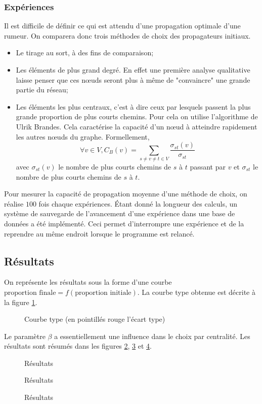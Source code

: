 \documentclass{article}
\newcommand{\resultat}[2]{
  \begin{figure}[!htb]
  \centering
  
  \caption{#2}
  \label{#1}
  \end{figure}
}
\begin{document}
\subsubsection{Expériences}
Il est difficile de définir ce qui est attendu d'une propagation optimale d'une rumeur. On comparera donc trois méthodes de choix des propagateurs initiaux.
\begin{itemize}
  \item Le tirage au sort, à des fins de comparaison;
  \item Les éléments de plus grand degré. En effet une première analyse qualitative laisse penser que ces nœuds seront plus à même de "convaincre" une grande partie du réseau;
  \item Les éléments les plus centraux, c'est à dire ceux par lesquels passent la plus grande proportion de plus courts chemins. Pour cela on utilise l'algorithme de Ulrik Brandes. Cela caractérise la capacité d'un nœud à atteindre rapidement les autres nœuds du graphe. Formellement, $$\forall v\in V, C_B(v) = \sum_{s\neq v\neq t\in V} \frac{\sigma_{st}(v)}{\sigma_{st}}$$ avec $\sigma_{st}(v)$ le nombre de plus courts chemins de $s$ à $t$ passant par $v$ et $\sigma_{st}$ le nombre de plus courts chemins de $s$ à $t$.
\end{itemize}

Pour mesurer la capacité de propagation moyenne d'une méthode de choix, on réalise $100$ fois chaque expériences. Étant donné la longueur des calculs, un système de sauvegarde de l'avancement d'une expérience dans une base de données a été implémenté. Ceci permet d'interrompre une expérience et de la reprendre au même endroit lorsque le programme est relancé.

\subsection{Résultats}
On représente les résultats sous la forme d'une courbe $\text{proportion finale}=f(\text{proportion initiale})$. La courbe type obtenue est décrite à la figure \ref{random_finale_f_initiale_q50_Beta50_ec}.

\resultat{random_finale_f_initiale_q50_Beta50_ec}{Courbe type (en pointillés rouge l'écart type)}

Le paramètre $\beta$ a essentiellement une influence dans le choix par centralité. Les résultats sont résumés dans les figures \ref{resultats1}, \ref{resultats2} et \ref{resultats3}.
\begin{figure}
\centering

\caption{Résultats}
\label{resultats1}
\end{figure}
\begin{figure}
\centering

\caption{Résultats}
\label{resultats2}
\end{figure}
\begin{figure}
\centering

\caption{Résultats}
\label{resultats3}
\end{figure}
\end{document}
